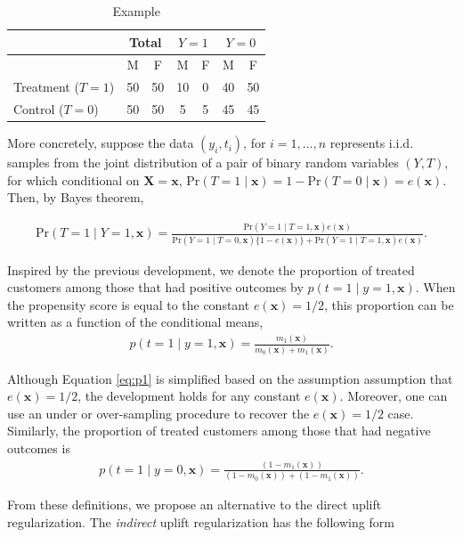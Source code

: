 \documentclass{article}
\def\X{\mathbf X}
\def\x{\mathbf x}
\begin{document}
\begin{table}[H]
    \centering
    \caption{Example}
    \begin{tabular}{|l|cc|cc|cc|}
        \hline
         & \multicolumn{2}{c|}{Total} & \multicolumn{2}{c|}{$Y=1$} & \multicolumn{2}{c|}{$Y=0$} \\
         \hline
         & M & F & M & F & M & F \\
         \hline
        Treatment ($T=1$) & 50 & 50 & 10 & 0 & 40 & 50 \\
        Control ($T=0$) & 50 & 50 & 5 & 5 & 45 & 45 \\ 
        \hline
    \end{tabular}
    \label{tab:example_ie}
\end{table}

More concretely, suppose the data $(y_i, t_i)$, for $i=1,\dots,n$ represents i.i.d. samples from the joint distribution of a pair of binary random variables $(Y,T)$, for which conditional on $\X=\x$, $\mathrm{Pr}(T = 1 \mid \x) = 1 - \mathrm{Pr}(T = 0 \mid \x) = e(\x)$. Then, by Bayes theorem,

\begin{align*}
    \mathrm{Pr}(T=1 \mid Y=1, \x) = \frac{ \mathrm{Pr}(Y=1 \mid T=1, \x)  e(\x)}{\mathrm{Pr}(Y=1 \mid T=0, \x) \{1- e(\x)\} + \mathrm{Pr}(Y=1 \mid T=1, \x)e(\x)} .
\end{align*}

Inspired by the previous development, we denote the proportion of treated customers among those that had positive outcomes by $p(t=1\mid y=1,\x)$. When the propensity score is equal to the constant $e(\x) = 1/2$, this proportion can be written as a function of the conditional means, 
\begin{align}
    p(t=1\mid y=1,\x) = \frac{m_1(\x)}{m_0(\x) + m_1(\x)}.
    \label{eq:p1}
\end{align}

Although Equation \eqref{eq:p1} is simplified based on the assumption assumption that $e(\x) = 1/2$, the development holds for any constant $e(\x)$. Moreover, one can use an under or over-sampling procedure to recover the $e(\x) = 1/2$ case. Similarly, the proportion of treated customers among those that had negative outcomes is
\begin{align}
    p(t=1\mid y=0,\x) = \frac{(1-m_1(\x))}{(1-m_0(\x)) +(1- m_1(\x))}.
    \label{eq:p0}
\end{align}

From these definitions, we propose an alternative to the direct uplift regularization. The \textit{indirect} uplift regularization has the following form
\end{document}
